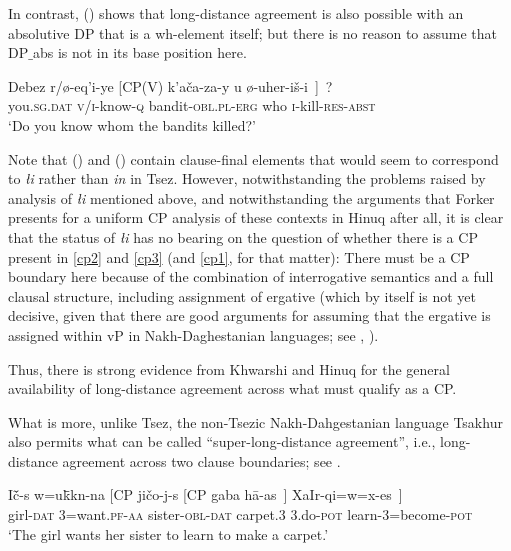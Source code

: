 \documentclass[output=paper
,modfonts
,nonflat]{langsci/langscibook}
\begin{document}
In contrast, (\Next) shows that long-distance agreement is also possible with
an absolutive DP that is a wh-element itself; but there is no reason
to assume that DP$\_${abs} is not in its base position here. 

\ea\label{ex:mueller:20} \label{cp3}
  \gll Debez r/\o -eq'i-ye [CP(V) k'a\v{c}a\textgamma -za-y \textbeltl u \o -uher-i\v{s}-\textbeltl i~]~? \\
  you.{\scshape sg.dat} {\scshape v/i}-know-{\scshape q} {} bandit-{\scshape obl.pl-erg}   who {\scshape i}-kill-{\scshape res-abst} \\ 
 \glt `Do you know whom the bandits killed?'
\z

Note that (\LLast) and (\Last) contain clause-final elements that
would seem to correspond to {\itshape {\l}i} rather than  {\it
  \textcrlambda in} in Tsez. However, notwithstanding the problems
raised by  analysis of {\itshape {\l}i}
mentioned above, and notwithstanding the arguments that Forker
presents for a uniform CP analysis of these contexts in Hinuq after
all, it is clear that the status of {\itshape {\l}i} has no bearing on the
question of whether there is a CP present in \ref{cp2} and \ref{cp3}
(and \ref{cp1}, for that matter): There must be a CP boundary here
because of the combination of interrogative semantics and a full
clausal structure, including assignment of ergative (which by itself
is not yet decisive, given that there are good arguments for assuming
that the ergative is assigned within vP in Nakh-Daghestanian
languages; see \cite{Gagliardietal:14}, \cite{Polinsky:16:arc}). 

Thus, there is strong evidence from Khwarshi and Hinuq for the general
availability of long-distance agreement across what must qualify as a
CP.

What is more, unlike Tsez, the non-Tsezic Nakh-Dahgestanian language
Tsakhur  also permits what can be called
``super-long-distance agreement'', i.e., long-distance agreement 
across two clause boundaries; see \cite{Kibrik:99}.

\ea\label{ex:mueller:21} \label{tsa1}
\gll I\v{c}\={\textsci}-s w=u\={k}\={\textsci}k\textbari n-na [CP ji\v{c}o-j-s [CP gaba  h\={a}\textglotstop-as~] XaIr-qi=w=x-es~] \\
     girl-\textsc{dat} {3}=want.\textsc{pf-{aa}} {} sister-\textsc{obl-dat} {} {carpet.3} 3.do-\textsc{pot} learn-{3}=become-\textsc{pot} \\
\glt `The girl wants her sister to learn to make a carpet.'
\z
\end{document}
